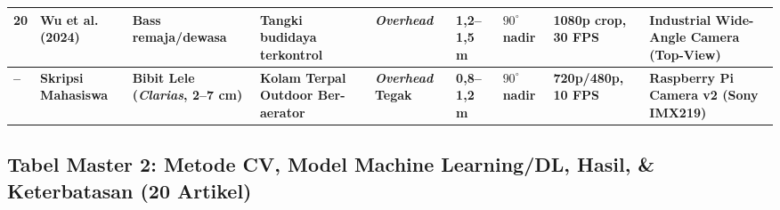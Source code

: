 \documentclass[10pt,a4paper]{article}
\begin{document}
{\begin{longtable}{@{}p{0.35cm} p{2.5cm} p{2.2cm} p{2.0cm} p{1.3cm} p{0.75cm} p{1.05cm} p{2.0cm} p{3.8cm}@{}}
20 & Wu et al. (2024) & Bass remaja/dewasa & Tangki budidaya terkontrol & \textit{Overhead} & 1,2--1,5 m & $90^\circ$ nadir & 1080p crop, 30 FPS & Industrial Wide-Angle Camera (Top-View) \\
\midrule
\textbf{--} & \textbf{Skripsi Mahasiswa} & \textbf{Bibit Lele (\textit{Clarias}, 2--7 cm)} & \textbf{Kolam Terpal Outdoor Ber-aerator} & \textbf{\textit{Overhead} Tegak} & \textbf{0,8--1,2 m} & \textbf{$90^\circ$ nadir} & \textbf{720p/480p, 10 FPS} & \textbf{Raspberry Pi Camera v2 (Sony IMX219)} \\
\bottomrule
\end{longtable}
}

\newpage

\subsection{Tabel Master 2: Metode CV, Model Machine Learning/DL, Hasil, \& Keterbatasan (20 Artikel)}
\end{document}
